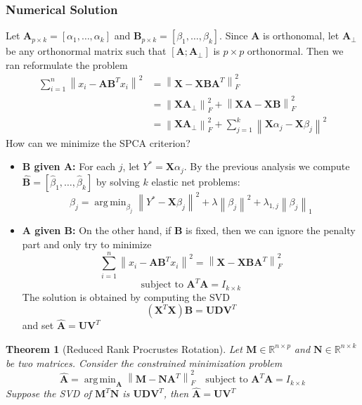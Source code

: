 \documentclass{beamer}
\theoremstyle{plain}
\newtheorem{thm}{Theorem}
\theoremstyle{definition}
\newcommand{\mat}[1]{\mathbf{#1}}
\DeclareMathOperator*{\argmin}{arg\,min}
\newcommand{\norm}[1]{\left\lVert #1 \right\rVert}
\begin{document}
\begin{frame}
\frametitle{Numerical Solution}
Let $\mat{A}_{p \times k} = \left[ \alpha_1, \ldots , \alpha_k\right]$ and $\mat{B}_{p \times k} = \left[ \beta_1, \ldots , \beta_k\right]$. Since $\mat A$ is orthonomal, let $\mat A_{\perp}$ be any orthonormal matrix such that $\left[ \mat A ; \mat A_{\perp} \right]$ is $p \times p$ orthonormal. Then we ran reformulate the problem
\begin{align*}
\sum_{i=1}^{n} \norm{x_i - \mat{A}\mat{B}^Tx_i}^2 & = \norm{\mat{X} - \mat{X} \mat{B} \mat{A}^T}_F^2\\
& = \norm{\mat X \mat A_{\perp}}_F^2 + \norm{\mat X \mat A - \mat X \mat B}_F^2\\
& = \norm{\mat X \mat A_{\perp}}_F^2 + \sum_{j=1}^{k} \norm{\mat X \alpha_j - \mat X \beta_j}^2
\end{align*}
How can we minimize the SPCA criterion?
\end{frame}

\begin{frame}
\begin{itemize}
\item{\textbf{$\mat B$ given $\mat A$:} For each $j$, let $Y^* = \mat X \alpha_j$. By the previous analysis we compute $\hat{\mat{B}} = \left[ \hat{\beta}_1, \ldots , \hat{\beta}_k\right]$ by solving $k$ elastic net problems:
$$\hat{\beta}_j = \argmin_{\beta_j} \norm{Y^* - \mat{X}\beta_j}^2 + \lambda \norm{\beta_j}^2 + \lambda_{1,j} \norm{\beta_j}_1$$}
\item{\textbf{$\mat A$ given $\mat B$:} On the other hand, if $\mat B$ is fixed, then we can ignore the penalty part and only try to minimize
$$\sum_{i=1}^{n} \norm{x_i - \mat{A}\mat{B}^Tx_i}^2 = \norm{\mat{X} - \mat{X} \mat{B} \mat{A}^T}_F^2$$
$$\text{subject to } \mat{A}^T\mat{A} = I_{k \times k}$$
The solution is obtained by computing the SVD
$$(\mat X^T \mat X) \mat B = \mat U \mat D \mat V^T$$
and set $\hat{\mat{A}} = \mat U \mat V^T$
}
\end{itemize}
\end{frame}

\begin{frame}
\begin{thm}[Reduced Rank Procrustes Rotation]
Let $\mat M \in \mathbb{R}^{n \times p}$ and $\mat N \in \mathbb{R}^{n \times k}$ be two matrices. Consider the constrained minimization problem
$$\hat{\mat{A}} = \argmin_{\mat A} \norm{\mat M - \mat N \mat A^T}_F^2 \quad \text{subject to } \mat{A}^T\mat{A} = I_{k \times k}$$
Suppose the SVD of $\mat M^T \mat N$ is $\mat U \mat D \mat V^T$, then $\hat{\mat{A}} = \mat U \mat V^T$
\end{thm}
\end{frame}
\end{document}
